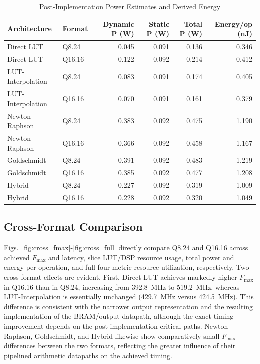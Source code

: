 \documentclass[manuscript,screen,review]{acmart}
\begin{document}
\begin{table}[H]
\caption{Post-Implementation Power Estimates and Derived Energy}
\label{tab:power}
\begin{tabular}{@{}llrrrr@{}}
\toprule
\textbf{Architecture} & \textbf{Format} & \textbf{Dynamic P (W)} & \textbf{Static P (W)} & \textbf{Total P (W)} & \textbf{Energy/op (nJ)} \\
\midrule
Direct LUT & Q8.24 & 0.045 & 0.091 & 0.136 & 0.346 \\
Direct LUT & Q16.16 & 0.122 & 0.092 & 0.214 & 0.412 \\
LUT-Interpolation & Q8.24 & 0.083 & 0.091 & 0.174 & 0.405 \\
LUT-Interpolation & Q16.16 & 0.070 & 0.091 & 0.161 & 0.379 \\
Newton-Raphson & Q8.24 & 0.383 & 0.092 & 0.475 & 1.190 \\
Newton-Raphson & Q16.16 & 0.366 & 0.092 & 0.458 & 1.167 \\
Goldschmidt & Q8.24 & 0.391 & 0.092 & 0.483 & 1.219 \\
Goldschmidt & Q16.16 & 0.385 & 0.092 & 0.477 & 1.208 \\
Hybrid & Q8.24 & 0.227 & 0.092 & 0.319 & 1.009 \\
Hybrid & Q16.16 & 0.228 & 0.092 & 0.320 & 1.049 \\
\bottomrule
\end{tabular}
\end{table}

\subsection{Cross-Format Comparison}
\label{sec:crossformat}

Figs.~\ref{fig:cross_fmax}-\ref{fig:cross_full} directly compare Q8.24 and Q16.16 across achieved $F_{\max}$ and latency, slice LUT/DSP resource usage, total power and energy per operation, and full four-metric resource utilization, respectively. Two cross-format effects are evident. First, Direct LUT achieves markedly higher $F_{\max}$ in Q16.16 than in Q8.24, increasing from 392.8~MHz to 519.2~MHz, whereas LUT-Interpolation is essentially unchanged (429.7~MHz versus 424.5~MHz). This difference is consistent with the narrower output representation and the resulting implementation of the BRAM/output datapath, although the exact timing improvement depends on the post-implementation critical paths. Newton-Raphson, Goldschmidt, and Hybrid likewise show comparatively small $F_{\max}$ differences between the two formats, reflecting the greater influence of their pipelined arithmetic datapaths on the achieved timing.
\end{document}

